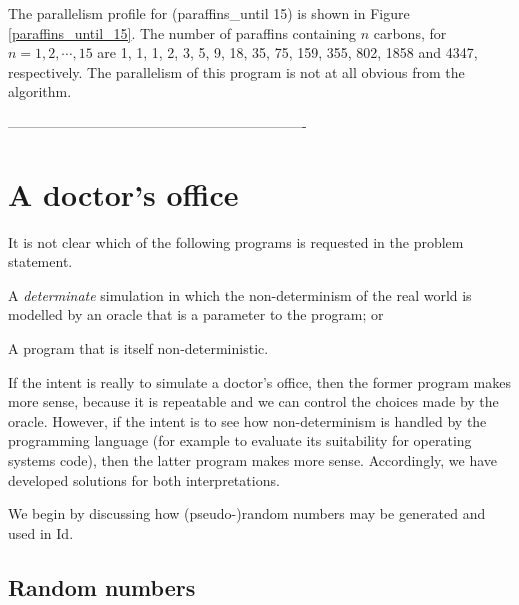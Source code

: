 The parallelism profile for {\cf (paraffins\_until 15)} is shown in
Figure \ref{paraffins_until_15}.  The number of paraffins containing
$n$ carbons, for $n=1,2,\cdots,15$ are 1, 1, 1, 2, 3, 5, 9, 18, 35,
75, 159, 355, 802, 1858 and 4347, respectively.  The parallelism of
this program is not at all obvious from the algorithm.


 \begin{figure}[htbp]
 \end{figure}
----------------------------------------------------------------



\section{A doctor's office}

It is not clear which of the following programs is requested in the
problem statement.

\begin{tightlist}

\item A {\em determinate\/} simulation in which the non-determinism
of the real world is modelled by an oracle that is a parameter to the
program; or

\item A program that is itself non-deterministic.

\end{tightlist}

If the intent is really to simulate a doctor's office, then the former
program makes more sense, because it is repeatable and we can control
the choices made by the oracle.  However, if the intent is to see how
non-determinism is handled by the programming language (for example to
evaluate its suitability for operating systems code), then the latter
program makes more sense.  Accordingly, we have developed solutions
for both interpretations.

We begin by discussing how (pseudo-)random numbers may be generated
and used in Id.

\subsection{Random numbers}

